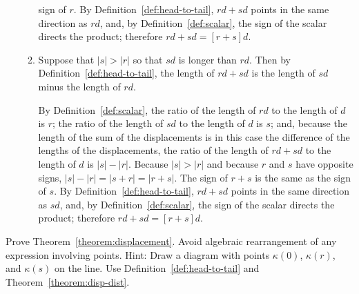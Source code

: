 \begin{exercise}
\begin{solution}
\begin{enumerate}
\begin{enumerate}
                  sign of $r$.  By Definition~\ref{def:head-to-tail}, $r d + s
                  d$ points in the same direction as $r d$, and, by
                  Definition~\ref{def:scalar}, the sign of the scalar directs
                  the product; therefore $r d + s d = [r + s] d$.
               \item Suppose that $|s| > |r|$ so that $s d$ is longer than $r
                  d$. Then by Definition~\ref{def:head-to-tail}, the length of
                  $r d + s d$ is the length of $s d$ minus the length of $r d$.
                  \begin{center}
                  \end{center}
                  By Definition~\ref{def:scalar}, the ratio of the length of $r
                  d$ to the length of $d$ is $r$; the ratio of the length of $s
                  d$ to the length of $d$ is $s$; and, because the length of
                  the sum of the displacements is in this case the difference
                  of the lengths of the displacements, the ratio of the length
                  of $r d + s d$ to the length of $d$ is $|s| - |r|$. Because
                  $|s| > |r|$ and because $r$ and $s$ have opposite signs, $|s|
                  - |r| = |s + r| = |r + s|$.  The sign of $r + s$ is the same
                  as the sign of $s$.  By Definition~\ref{def:head-to-tail}, $r
                  d + s d$ points in the same direction as $s d$, and, by
                  Definition~\ref{def:scalar}, the sign of the scalar directs
                  the product; therefore $r d + s d = [r + s] d$.
            \end{enumerate}
      \end{enumerate}
   \end{solution}
\end{exercise}

\begin{exercise}
   Prove Theorem~\ref{theorem:displacement}. Avoid algebraic rearrangement of
   any expression involving points.  Hint: Draw a diagram with points
   $\kappa(0)$, $\kappa(r)$, and $\kappa(s)$ on the line. Use
   Definition~\ref{def:head-to-tail} and Theorem~\ref{theorem:disp-dist}.
\end{exercise}

